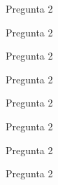 \documentclass[aspectratio=169]{beamer}
\begin{document}
\begin{frame}
\begin{block}{Pregunta 2}

\end{block}
\end{frame}\begin{frame}
\begin{block}{Pregunta 2}

\end{block}
\end{frame}




\begin{frame}
\begin{block}{Pregunta 2}

\end{block}
\end{frame}




\begin{frame}
\begin{block}{Pregunta 2}

\end{block}
\end{frame}




\begin{frame}
\begin{block}{Pregunta 2}

\end{block}
\end{frame}\begin{frame}
\begin{block}{Pregunta 2}

\end{block}
\end{frame}




\begin{frame}
\begin{block}{Pregunta 2}

\end{block}
\end{frame}



\begin{frame}
\begin{block}{Pregunta 2}

\end{block}
\end{frame}
\end{document}
